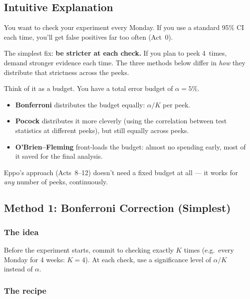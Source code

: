 \documentclass[12pt, a4paper]{article}
\begin{document}
\subsection{Intuitive Explanation}

\begin{intuition}
You want to check your experiment every Monday.  If you use a standard
95\% CI each time, you'll get false positives far too often (Act~0).

The simplest fix: \textbf{be stricter at each check.}  If you plan to peek
4~times, demand stronger evidence each time.  The three methods below
differ in \emph{how} they distribute that strictness across the peeks.

Think of it as a budget.  You have a total error budget of $\alpha = 5\%$.
\begin{itemize}[nosep]
  \item \textbf{Bonferroni} distributes the budget equally:
        $\alpha/K$ per peek.
  \item \textbf{Pocock} distributes it more cleverly (using the correlation
        between test statistics at different peeks), but still equally across
        peeks.
  \item \textbf{O'Brien--Fleming} front-loads the budget: almost no spending
        early, most of it saved for the final analysis.
\end{itemize}

Eppo's approach (Acts~8--12) doesn't need a fixed budget at all --- it works
for \emph{any} number of peeks, continuously.
\end{intuition}


\subsection{Method 1: Bonferroni Correction (Simplest)}

\subsubsection*{The idea}

Before the experiment starts, commit to checking exactly $K$ times
(e.g.\ every Monday for 4 weeks: $K = 4$).  At each check, use a
significance level of $\alpha/K$ instead of $\alpha$.

\subsubsection*{The recipe}
\end{document}
